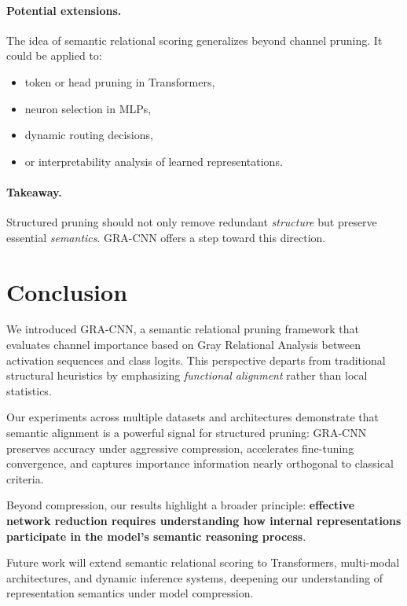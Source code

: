 \documentclass[sn-mathphys,Numbered]{sn-jnl}
\begin{document}
\paragraph{Potential extensions.}
The idea of semantic relational scoring generalizes beyond channel pruning.
It could be applied to:
\begin{itemize}
    \item token or head pruning in Transformers,
    \item neuron selection in MLPs,
    \item dynamic routing decisions,
    \item or interpretability analysis of learned representations.
\end{itemize}

\paragraph{Takeaway.}
Structured pruning should not only remove redundant \emph{structure} but preserve essential \emph{semantics}.
GRA-CNN offers a step toward this direction.

\section{Conclusion}

We introduced GRA-CNN, a semantic relational pruning framework that evaluates channel importance based on Gray Relational Analysis between activation sequences and class logits.
This perspective departs from traditional structural heuristics by emphasizing \emph{functional alignment} rather than local statistics.

Our experiments across multiple datasets and architectures demonstrate that semantic alignment is a powerful signal for structured pruning:
GRA-CNN preserves accuracy under aggressive compression, accelerates fine-tuning convergence, and captures importance information nearly orthogonal to classical criteria.

Beyond compression, our results highlight a broader principle:
\textbf{effective network reduction requires understanding how internal representations participate in the model’s semantic reasoning process}.

Future work will extend semantic relational scoring to Transformers, multi-modal architectures, and dynamic inference systems, deepening our understanding of representation semantics under model compression.

\clearpage


\end{document}
